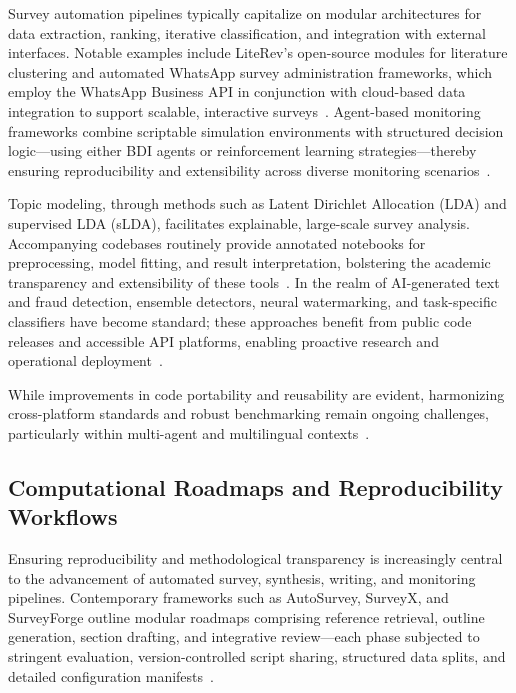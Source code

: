 \documentclass[sigconf]{acmart}
\begin{document}
Survey automation pipelines typically capitalize on modular architectures for data extraction, ranking, iterative classification, and integration with external interfaces. Notable examples include LiteRev’s open-source modules for literature clustering and automated WhatsApp survey administration frameworks, which employ the WhatsApp Business API in conjunction with cloud-based data integration to support scalable, interactive surveys~\cite{ref84}\cite{ref86}\cite{ref94}\cite{ref104}. Agent-based monitoring frameworks combine scriptable simulation environments with structured decision logic---using either BDI agents or reinforcement learning strategies---thereby ensuring reproducibility and extensibility across diverse monitoring scenarios~\cite{ref88}\cite{ref91}\cite{ref92}\cite{ref100}\cite{ref102}\cite{ref112}\cite{ref113}\cite{ref114}\cite{ref115}\cite{ref117}.

Topic modeling, through methods such as Latent Dirichlet Allocation (LDA) and supervised LDA (sLDA), facilitates explainable, large-scale survey analysis. Accompanying codebases routinely provide annotated notebooks for preprocessing, model fitting, and result interpretation, bolstering the academic transparency and extensibility of these tools~\cite{ref89}\cite{ref93}\cite{ref113}. In the realm of AI-generated text and fraud detection, ensemble detectors, neural watermarking, and task-specific classifiers have become standard; these approaches benefit from public code releases and accessible API platforms, enabling proactive research and operational deployment~\cite{ref91}\cite{ref94}\cite{ref104}\cite{ref117}.

While improvements in code portability and reusability are evident, harmonizing cross-platform standards and robust benchmarking remain ongoing challenges, particularly within multi-agent and multilingual contexts~\cite{ref92}\cite{ref102}\cite{ref113}\cite{ref115}.

\subsection{Computational Roadmaps and Reproducibility Workflows}

Ensuring reproducibility and methodological transparency is increasingly central to the advancement of automated survey, synthesis, writing, and monitoring pipelines. Contemporary frameworks such as AutoSurvey, SurveyX, and SurveyForge outline modular roadmaps comprising reference retrieval, outline generation, section drafting, and integrative review—each phase subjected to stringent evaluation, version-controlled script sharing, structured data splits, and detailed configuration manifests~\cite{ref78,ref87,ref100,ref102,ref104,ref113,ref114,ref115}.
\end{document}
